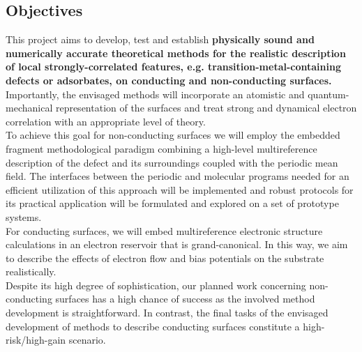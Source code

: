 \documentclass[a4paper,11pt,headings=normal]{scrartcl}
\begin{document}
\begin{itemize}
\subsection{Objectives}
This project aims to develop, test and establish \textbf{physically sound and 
numerically accurate theoretical methods for the realistic description of 
local strongly-correlated features, e.g. transition-metal-containing defects or adsorbates, on conducting and non-conducting surfaces.}  Importantly, the 
envisaged methods will incorporate an atomistic and quantum-mechanical 
representation of the surfaces and treat strong and dynamical electron 
correlation with an appropriate level of theory.\\ 
To achieve this goal for non-conducting surfaces we will employ the embedded 
fragment methodological paradigm combining a high-level multireference 
description of the defect and its surroundings coupled with the periodic 
mean field. The interfaces between the periodic and molecular programs needed for 
an efficient utilization of this approach will be implemented and robust 
protocols for its practical application will be formulated and explored on a 
set of prototype systems.\\
For conducting surfaces, we will embed multireference electronic structure 
calculations in an electron reservoir that is grand-canonical. In this way, we 
aim to describe the effects of electron flow and bias potentials on the 
substrate realistically.\\
Despite its high degree of sophistication, our planned work concerning 
non-conducting surfaces has a high chance of success as the involved method 
development is straightforward. In contrast, the final tasks of the envisaged development of 
methods to describe conducting surfaces constitute a high-risk/high-gain 
scenario. 



\end{itemize}
\end{document}
